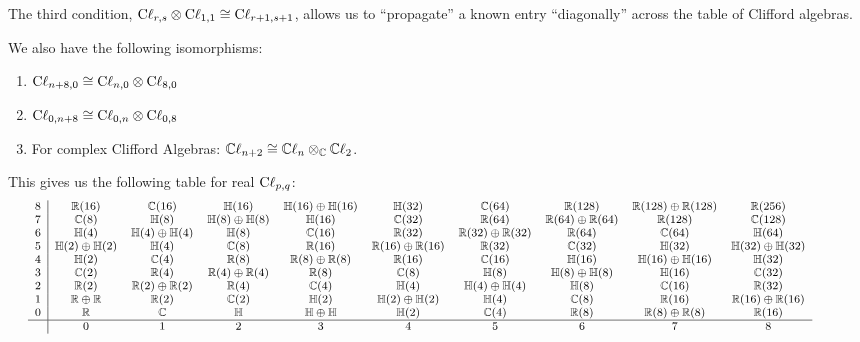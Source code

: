 \begin{remark}
The third condition, $\mathrm{C}\ell_{r,s}\otimes\mathrm{C}\ell_{1,1}\cong\mathrm{C}\ell_{r+1,s+1}$,
allows us to ``propagate'' a known entry ``diagonally'' across the table
of Clifford algebras.
\end{remark}

We also have the following isomorphisms:
\begin{enumerate}
\item $\mathrm{C}\ell_{n+8,0}\cong\mathrm{C}\ell_{n,0}\otimes\mathrm{C}\ell_{8,0}$
\item $\mathrm{C}\ell_{0,n+8}\cong\mathrm{C}\ell_{0,n}\otimes\mathrm{C}\ell_{0,8}$
\item For complex Clifford Algebras: $\mathbb{C}\ell_{n+2}\cong\mathbb{C}\ell_{n}\otimes_{\mathbb{C}}\mathbb{C}\ell_{2}$.
\end{enumerate}

\M
This gives us the following table for real $\mathrm{C}\ell_{p,q}$:
\begin{equation*}
  \begin{footnotesize}\hskip-3em
\begin{array}{c|ccccccccc}
  8 & \RR(16)            & \CC(16) & \HH(16) & \HH(16)\oplus\HH(16) & \HH(32) & \CC(64) & \RR(128) & \RR(128)\oplus\RR(128) & \RR(256)\\
  7 & \CC(8)             & \HH(8) & \HH(8)\oplus\HH(8) & \HH(16) & \CC(32) & \RR(64) & \RR(64)\oplus\RR(64) & \RR(128) & \CC(128)\\
  6 & \HH(4)             & \HH(4)\oplus\HH(4) & \HH(8) & \CC(16) & \RR(32) & \RR(32)\oplus\RR(32) & \RR(64) & \CC(64) & \HH(64)\\
  5 & \HH(2)\oplus\HH(2) & \HH(4) & \CC(8) & \RR(16) & \RR(16)\oplus\RR(16) & \RR(32) & \CC(32) & \HH(32) & \HH(32)\oplus\HH(32)\\
  4 & \HH(2)             & \CC(4) & \RR(8) & \RR(8)\oplus\RR(8) & \RR(16) & \CC(16) & \HH(16) & \HH(16)\oplus\HH(16)  & \HH(32)\\
  3 & \CC(2)             & \RR(4) & \RR(4)\oplus\RR(4) & \RR(8) & \CC(8) & \HH(8) & \HH(8)\oplus\HH(8) & \HH(16) & \CC(32)\\
  2 & \RR(2)             & \RR(2)\oplus\RR(2) & \RR(4) & \CC(4) & \HH(4) & \HH(4)\oplus\HH(4) & \HH(8) & \CC(16) & \RR(32)\\
  1 & \RR\oplus\RR       & \RR(2) & \CC(2) & \HH(2) & \HH(2)\oplus\HH(2) & \HH(4) & \CC(8) & \RR(16)  & \RR(16)\oplus\RR(16) \\
  0 & \RR                & \CC    & \HH & \HH\oplus\HH & \HH(2) & \CC(4) & \RR(8) & \RR(8)\oplus\RR(8) & \RR(16) \\\hline
    & 0                  & 1  & 2 & 3 & 4 & 5 & 6 & 7 & 8
\end{array}
  \end{footnotesize}
\end{equation*}

